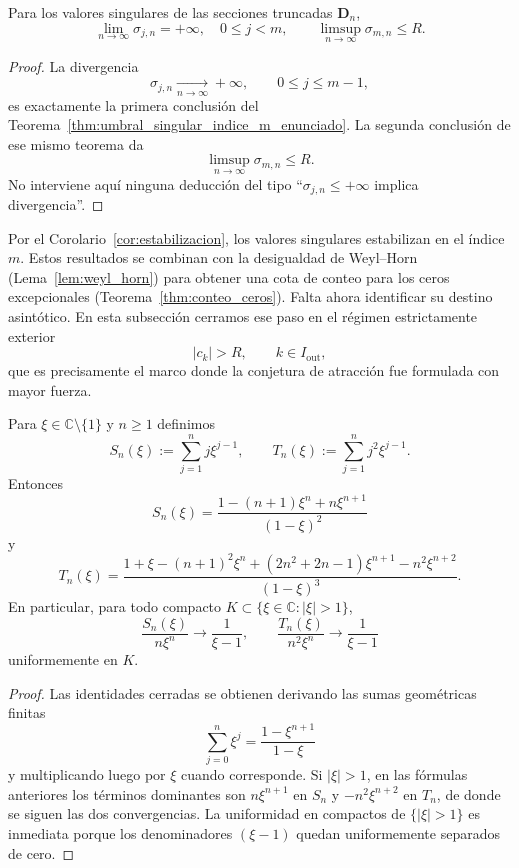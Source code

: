 \begin{cor}\label{cor:estabilizacion}
	Para los valores singulares de las secciones truncadas $\mathbf{D}_n$,
	\[
		\lim_{n\to\infty}\sigma_{j,n}=+\infty,\quad 0\le j<m,
		\qquad
		\limsup_{n\to\infty}\sigma_{m,n}\le R.
	\]
\end{cor}

\begin{proof}
	La divergencia
	\[
		\sigma_{j,n}\xrightarrow[n\to\infty]{}+\infty,
		\qquad 0\le j\le m-1,
	\]
	es exactamente la primera conclusión del Teorema~\ref{thm:umbral_singular_indice_m_enunciado}. La segunda conclusión de ese mismo teorema da
	\[
		\limsup_{n\to\infty}\sigma_{m,n}\le R.
	\]
	No interviene aquí ninguna deducción del tipo ``$\sigma_{j,n}\le +\infty$ implica divergencia''.
\end{proof}

Por el Corolario~\ref{cor:estabilizacion}, los valores singulares estabilizan en el índice $m$. Estos resultados se combinan con la desigualdad de Weyl--Horn (Lema~\ref{lem:weyl_horn}) para obtener una cota de conteo para los ceros excepcionales (Teorema~\ref{thm:conteo_ceros}). Falta ahora identificar su destino asintótico. En esta subsección cerramos ese paso en el régimen estrictamente exterior
\[
	|c_k|>R,\qquad k\in I_{\mathrm{out}},
\]
que es precisamente el marco donde la conjetura de atracción fue formulada con mayor fuerza.

\begin{lem}\label{lem:sumas_geometricas_ponderadas}
	Para $\xi\in\mathbb C\setminus\{1\}$ y $n\ge1$ definimos
	\[
		S_n(\xi):=\sum_{j=1}^n j\xi^{j-1},
		\qquad
		T_n(\xi):=\sum_{j=1}^n j^2\xi^{j-1}.
	\]
	Entonces
	\[
		S_n(\xi)=\frac{1-(n+1)\xi^n+n\xi^{n+1}}{(1-\xi)^2}
	\]
	y
	\[
		T_n(\xi)=\frac{1+\xi-(n+1)^2\xi^n+(2n^2+2n-1)\xi^{n+1}-n^2\xi^{n+2}}{(1-\xi)^3}.
	\]
	En particular, para todo compacto $K\subset\{\xi\in\mathbb C:|\xi|>1\}$,
	\[
		\frac{S_n(\xi)}{n\xi^n}\longrightarrow \frac{1}{\xi-1},
		\qquad
		\frac{T_n(\xi)}{n^2\xi^n}\longrightarrow \frac{1}{\xi-1}
	\]
	uniformemente en $K$.
\end{lem}

\begin{proof}
	Las identidades cerradas se obtienen derivando las sumas geométricas finitas
	\[
		\sum_{j=0}^n \xi^j=\frac{1-\xi^{n+1}}{1-\xi}
	\]
	y multiplicando luego por $\xi$ cuando corresponde. Si $|\xi|>1$, en las fórmulas anteriores los términos dominantes son $n\xi^{n+1}$ en $S_n$ y $-n^2\xi^{n+2}$ en $T_n$, de donde se siguen las dos convergencias. La uniformidad en compactos de $\{|\xi|>1\}$ es inmediata porque los denominadores $(\xi-1)$ quedan uniformemente separados de cero.
\end{proof}

